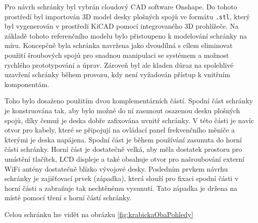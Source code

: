 Pro návrh schránky byl vybrán cloudový CAD software Onshape. Do tohoto prostředí byl importován 3D model desky plošných spojů ve formátu \texttt{.stl}, který byl vygenerován v prostředí KiCAD pomocí integrovaného 3D prohlížeče. Na základě tohoto referenčního modelu bylo přistoupeno k modelování schránky na míru. Koncepčně byla schránka navržena jako dvoudílná s cílem eliminovat použití šroubových spojů pro snadnou manipulaci se systémem a možnost rychlého prototypování a úprav. Zároveň byl ale kladen důraz na spolehlivé uzavření schránky během provozu, kdy není vyžadován přístup k vnitřním komponentám.

Toho bylo dosaženo použitím dvou komplementárních částí. Spodní část schránky je konstruována tak, aby bylo možné do ní zasunout osazenou desku plošných spojů, díky čemuž je deska dobře zafixována uvnitř schránky. V této části je navíc otvor pro kabely, které se připojují na ovládací panel frekvenčního měniče a kterými je deska napájena. Spodní část je během používání zasunuta do horní části schránky. Horní část je dostatečně velká, aby měla dostatek prostoru pro umístění tlačítek, LCD displeje a také obsahuje otvor pro našroubování externí WiFi antény dostatečně blízko vývojové desky. Posledním prvkem návrhu schránky je zajišťovací prvek (západka), která slouží pro fixaci spodní části v horní části a zabraňuje tak nechtěnému vysunutí. Tato západka je držena na místě pomocí tření s horní částí schránky.

Celou schránku lze vidět na obrázku \ref{fig:krabickaObaPohledy}

